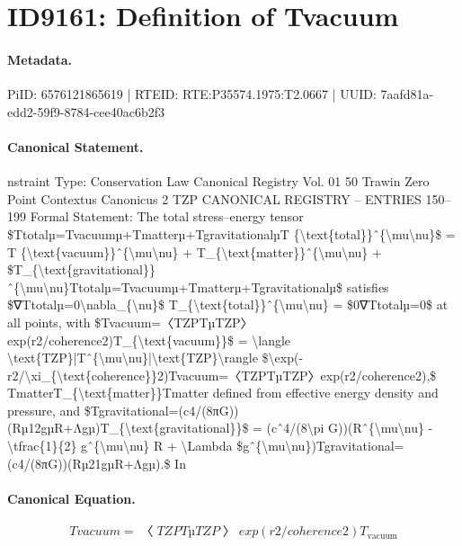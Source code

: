 \section*{ID9161: Definition of Tvacuum}
\paragraph{Metadata.}
PiID: 6576121865619 | RTEID: RTE:P35574.1975:T2.0667 | UUID: 7aafd81a-edd2-59f9-8784-cee40ac6b2f3

\paragraph{Canonical Statement.}
nstraint Type: Conservation Law Canonical Registry Vol. 01 50 Trawin Zero Point Contextus Canonicus 2 TZP CANONICAL REGISTRY – ENTRIES 150–199 Formal Statement: The total stress–energy tensor \$Ttotalµ=Tvacuumµ+Tmatterµ+TgravitationalµT \{\textbackslash{}text\{total\}\}ˆ\{\textbackslash{}mu\textbackslash{}nu\}\$ = T \{\textbackslash{}text\{vacuum\}\}ˆ\{\textbackslash{}mu\textbackslash{}nu\} + T\_\{\textbackslash{}text\{matter\}\}ˆ\{\textbackslash{}mu\textbackslash{}nu\} + \$T\_\{\textbackslash{}text\{gravitational\}\}ˆ\{\textbackslash{}mu\textbackslash{}nu\}Ttotalµ=Tvacuumµ+Tmatterµ+Tgravitationalµ\$ satisfies \$∇Ttotalµ=0\textbackslash{}nabla\_\{\textbackslash{}nu\}\$ T\_\{\textbackslash{}text\{total\}\}ˆ\{\textbackslash{}mu\textbackslash{}nu\} = \$0∇Ttotalµ=0\$ at all points, with \$Tvacuum=〈TZPTµTZP〉exp(r2/coherence2)T\_\{\textbackslash{}text\{vacuum\}\}\$ = \textbackslash{}langle \textbackslash{}text\{TZP\}|Tˆ\{\textbackslash{}mu\textbackslash{}nu\}|\textbackslash{}text\{TZP\}\textbackslash{}rangle \$\textbackslash{}exp(-r2/\textbackslash{}xi\_\{\textbackslash{}text\{coherence\}\}2)Tvacuum=〈TZPTµTZP〉exp(r2/coherence2),\$ TmatterT\_\{\textbackslash{}text\{matter\}\}Tmatter defined from effective energy density and pressure, and \$Tgravitational=(c4/(8πG))(Rµ12gµR+Λgµ)T\_\{\textbackslash{}text\{gravitational\}\}\$ = (cˆ4/(8\textbackslash{}pi G))(Rˆ\{\textbackslash{}mu\textbackslash{}nu\} -\textbackslash{}tfrac\{1\}\{2\} gˆ\{\textbackslash{}mu\textbackslash{}nu\} R + \textbackslash{}Lambda \$gˆ\{\textbackslash{}mu\textbackslash{}nu\})Tgravitational=(c4/(8πG))(Rµ21gµR+Λgµ).\$ In

\paragraph{Canonical Equation.}
\[
Tvacuum=〈TZPTµTZP〉exp(r2/coherence2)T_{\text{vacuum}}
\]

